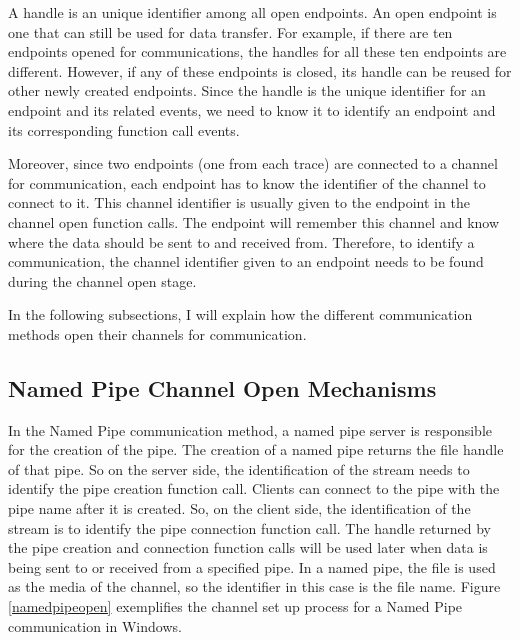 \documentclass[12pt,oneside]{book}
\begin{document}
A handle is an unique identifier among all open endpoints. An open endpoint is one that can still be used for data transfer. For example, if there are ten endpoints opened for communications, the handles for all these ten endpoints are different. However, if any of these endpoints is closed, its handle can be reused for other newly created endpoints. Since the handle is the unique identifier for an endpoint and its related events, we need to know it to identify an endpoint and its corresponding function call events. 

Moreover, since two endpoints (one from each trace) are connected to a channel for communication, each endpoint has to know the identifier of the channel to connect to it. This channel identifier is usually given to the endpoint in the channel open function calls. The endpoint will remember this channel and know where the data should be sent to and received from. Therefore, to identify a communication, the channel identifier given to an endpoint needs to be found during the channel open stage.

In the following subsections, I will explain how the different communication methods open their channels for communication.

\subsection{Named Pipe Channel Open Mechanisms} 
In the Named Pipe communication method, a named pipe server is responsible for the creation of the pipe. The creation of a named pipe returns the file handle of that pipe. So on the server side, the identification of the stream needs to identify the pipe creation function call. Clients can connect to the pipe with the pipe name after it is created. So, on the client side, the identification of the stream is to identify the pipe connection function call. The handle returned by the pipe creation and connection function calls will be used later when data is being sent to or received from a specified pipe. In a named pipe, the file is used as the media of the channel, so the identifier in this case is the file name. \cite{WinNamedpipe} Figure \ref{namedpipeopen} exemplifies the channel set up process for a Named Pipe communication in Windows. 
\end{document}
